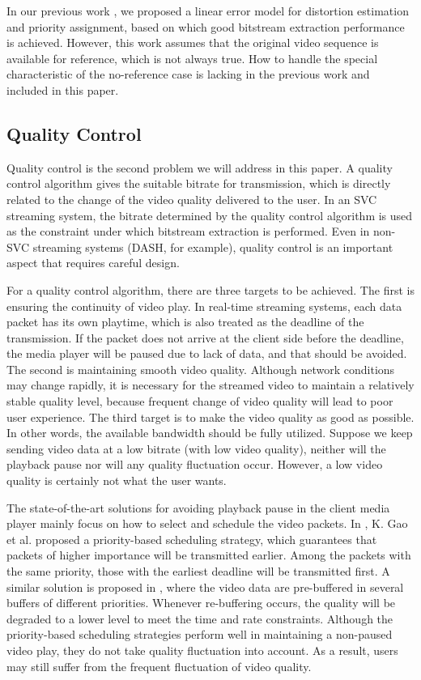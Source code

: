 \documentclass[journal,draftclsnofoot,onecolumn]{IEEEtran}
\begin{document}
In our previous work \cite{Zhang12}, we proposed a linear error model for distortion estimation and priority assignment, based on which good bitstream extraction performance is achieved. However, this work assumes that the original video sequence is available for reference, which is not always true. How to handle the special characteristic of the no-reference case is lacking in the previous work and included in this paper.

\subsection{Quality Control}
\label{subsec:analysis-control}

Quality control is the second problem we will address in this paper. A quality control algorithm gives the suitable bitrate for transmission, which is directly related to the change of the video quality delivered to the user. In an SVC streaming system, the bitrate determined by the quality control algorithm is used as the constraint under which bitstream extraction is performed. Even in non-SVC streaming systems (DASH, for example), quality control is an important aspect that requires careful design.

For a quality control algorithm, there are three targets to be achieved. The first is ensuring the continuity of video play. In real-time streaming systems, each data packet has its own playtime, which is also treated as the deadline of the transmission. If the packet does not arrive at the client side before the deadline, the media player will be paused due to lack of data, and that should be avoided. The second is maintaining smooth video quality. Although network conditions may change rapidly, it is necessary for the streamed video to maintain a relatively stable quality level, because frequent change of video quality will lead to poor user experience. The third target is to make the video quality as good as possible. In other words, the available bandwidth should be fully utilized. Suppose we keep sending video data at a low bitrate (with low video quality), neither will the playback pause nor will any quality fluctuation occur. However, a low video quality is certainly not what the user wants.

The state-of-the-art solutions for avoiding playback pause in the client media player mainly focus on how to select and schedule the video packets. In \cite{Gao06}, K. Gao et al. proposed a priority-based scheduling strategy, which guarantees that packets of higher importance will be transmitted earlier. Among the packets with the same priority, those with the earliest deadline will be transmitted first. A similar solution is proposed in \cite{Schierl10}, where the video data are pre-buffered in several buffers of different priorities. Whenever re-buffering occurs, the quality will be degraded to a lower level to meet the time and rate constraints. Although the priority-based scheduling strategies perform well in maintaining a non-paused video play, they do not take quality fluctuation into account. As a result, users may still suffer from the frequent fluctuation of video quality.
\end{document}
